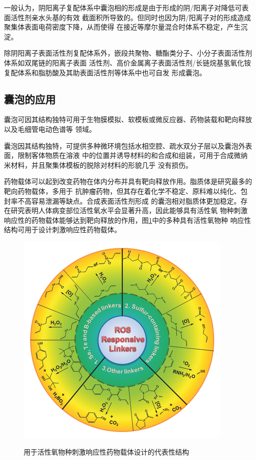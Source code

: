\documentclass[bachelor,winfonts,replaceperiod]{jnuthesis}
\begin{document}
    一般认为，阴阳离子复配体系中囊泡相的形成是由于形成的阴/阳离子对降低可表面活性剂亲水头基的有效
    截面积所导致的\cite{刘洪国2016}。但同时也因为阴/阳离子对的形成造成聚集体表面电荷密度下降，从而使得
    在接近等摩尔量混合时体系不稳定，产生沉淀。
    
    除阴阳离子表面活性剂复配体系外，嵌段共聚物、糖酯类分子、小分子表面活性剂体系如双尾链的阳离子表面
    活性剂、高价金属离子表面活性剂/长链烷基氢氧化铵复配体系和脂肪酸及其助表面活性剂等体系中也可自发
    形成囊泡\cite{刘洪国2016}。
        
    \subsection{囊泡的应用}
    囊泡可因其结构独特可用于生物膜模拟、软模板或微反应器、药物装载和靶向释放以及毛细管电动色谱等
    领域\cite{蒋玲玲2018}。
    
    囊泡因其结构独特，可提供多种微环境包括水相空腔、疏水双分子层以及囊泡外表面，限制客体物质在溶液
    中的位置并诱导材料的和合成和组装，可用于合成微纳米材料，并且聚集体模板的脱除对材料的形貌几乎
    没有损伤。
    
    药物载体可以起到改变药物在体内分布并具有靶向释放作用。脂质体是研究最多的靶向药物载体，多用于
    抗肿瘤药物，但其存在着化学不稳定、原料难以纯化、包封率不高容易泄漏等缺点。合成表面活性剂形成
    的囊泡相对脂质体更加稳定。存在研究表明人体病变部位活性氧水平会显著升高，因此能够具有活性氧
    物种刺激响应性的药物载体能够达到靶向释放的作用，图\ref{fig:vesicle-ros}中的多种具有活性氧物种
    响应性结构可用于设计刺激响应性药物载体。
    \begin{figure}[htbp]
        \centering
        \includegraphics[width= .426\textwidth]{figure/vesicle-ros.png}\\
        \caption{用于活性氧物种刺激响应性药物载体设计的代表性结构\cite{saravanakumar2017}}
        \label{fig:vesicle-ros}
    \end{figure}
    
\end{document}
